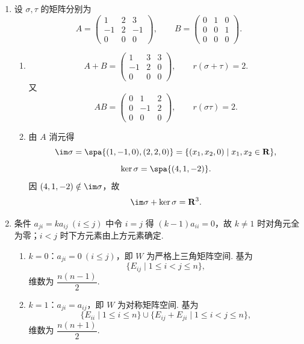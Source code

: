 \begin{enumerate}
    \item 设 $\sigma,\tau$ 的矩阵分别为
    \[
        A=\begin{pmatrix}
            1&2&3\\
            -1&2&-1\\
            0&0&0
        \end{pmatrix},\qquad
        B=\begin{pmatrix}
            0&1&0\\
            0&0&1\\
            0&0&0
        \end{pmatrix}.
    \]
    \begin{enumerate}
        \item
        \[
            A+B=\begin{pmatrix}
                1&3&3\\
                -1&2&0\\
                0&0&0
            \end{pmatrix},\qquad r(\sigma+\tau)=2.
        \]
        又
        \[
            AB=\begin{pmatrix}
                0&1&2\\
                0&-1&2\\
                0&0&0
            \end{pmatrix},\qquad r(\sigma\tau)=2.
        \]

        \item 由 $A$ 消元得
        \[
            \im\sigma=\spa\{(1,-1,0),(2,2,0)\}
            =\{(x_1,x_2,0)\mid x_1,x_2\in\mathbf{R}\},
        \]
        \[
            \ker\sigma=\spa\{(4,1,-2)\}.
        \]
        因 $(4,1,-2)\notin\im\sigma$，故
        \[
            \im\sigma+\ker\sigma=\mathbf{R}^3.
        \]
    \end{enumerate}

    \item 条件 $a_{ji}=ka_{ij}\ (i\leqslant j)$ 中令 $i=j$ 得 $(k-1)a_{ii}=0$，故 $k\neq 1$ 时对角元全为零；$i<j$ 时下方元素由上方元素确定.
    \begin{enumerate}
        \item $k=0$：$a_{ji}=0\ (i\leqslant j)$，即 $W$ 为严格上三角矩阵空间. 基为
        \[
            \{E_{ij}\mid 1\leqslant i<j\leqslant n\},
        \]
        维数为 $\dfrac{n(n-1)}2$.

        \item $k=1$：$a_{ji}=a_{ij}$，即 $W$ 为对称矩阵空间. 基为
        \[
            \{E_{ii}\mid 1\leqslant i\leqslant n\}
            \cup
            \{E_{ij}+E_{ji}\mid 1\leqslant i<j\leqslant n\},
        \]
        维数为 $\dfrac{n(n+1)}2$.


\end{enumerate}
\end{enumerate}

